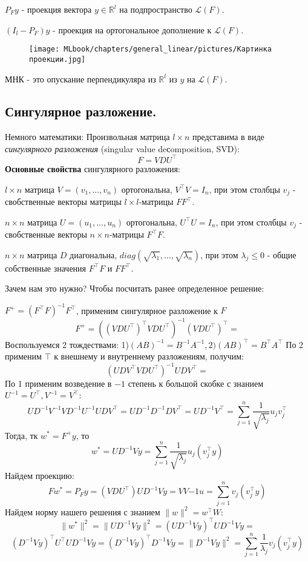 $P_Fy$ - проекция вектора $y \in \mathbb{R}^l$ на подпространство $\mathcal{L}(F)$.

$(I_l - P_F)y$ - проекция на ортогональное дополнение к $\mathcal{L}(F)$.

\begin{figure}[h]
    \centering
    \texttt{[image: MLbook/chapters/general\_linear/pictures/Картинка проекции.jpg]}
\end{figure}

МНК - это опускание перпендикуляра из $\mathbb{R}^l$ из $y$ на $\mathcal{L}(F)$.
 
\subsection*{Сингулярное разложение.} 

Немного математики:
Произвольная матрица $l \times n$ представима в виде \textit{сингулярного разложения}  (singular value deсomposition, SVD):
$$F = VDU^\top$$
\noindent\textbf{Основные свойства} сингулярного разложения:

$l \times n$ матрица $V = (v_1, ..., v_n)$ ортогональна, $V^\top V = I_n$, при этом столбцы $v_j$ - свобственные векторы матрицы $l \times l$-матрицы $FF^\top$.

$n \times n$ матрица $U = (u_1, ..., u_n)$ ортогональна, $U^\top U = I_n$, при этом столбцы $v_j$ - свобственные векторы $n \times n$-матрицы $F^\top F$.

$n \times n$ матрица $D$ диагональна, $diag(\sqrt{\lambda_1}, ..., \sqrt{\lambda_n})$, при этом $\lambda_j \leq 0$ - общие собственные значения $F^\top F$ и $FF^\top$.

Зачем нам это нужно? Чтобы посчитать ранее определенное решение:

$F^+ = (F^\top F)^{-1}F^\top$, применим сингулярное разложение к $F$
$$F^+ = ((VDU^\top)^\top VDU^\top)^{-1} (VDU^\top)^\top =$$ 
Воспользуемся 2 тождествами: 1)$(AB)^{-1} = B^{-1} A^{-1}, 2) (AB)^{\top} = B^{\top} A^{\top}$
По 2 применим $\top$ к внешнему и внутреннему разложениям, получим:
$$(UDV^\top VDU^\top)^{-1} UDV^\top =$$
По 1 применим возведение в $-1$ степень к большой скобке с знанием $U^{-1} = U^\top, V^{-1} = V^\top$:
$$UD^{-1}V^{-1}VD^{-1}U^{-1} UDV^\top = UD^{-1}D^{-1}DV^\top = UD^{-1}V^\top = \sum_{j = 1}^n \frac{1}{\sqrt{\lambda_j}}u_j v_j^\top$$
Тогда, тк $w^* = F^+ y$, то
$$w^* = UD^{-1}Vy = \sum_{j = 1}^n \frac{1}{\sqrt{\lambda_j}}u_j (v_j^\top y)$$
Найдем проекцию:
$$Fw^* = P_Fy = (VDU^\top) UD^{-1}Vy = VV{-1}u = \sum_{j = 1}^n v_j(v_j^\top y)$$
Найдем норму нашего решения с знанием $\|w\|^2 = w^\top W$:
$$\|w^*\|^2 = \|UD^{-1}Vy\|^2 = (UD^{-1}Vy)^\top UD^{-1}Vy =$$
$$(D^{-1}Vy)^{\top} U^\top UD^{-1}Vy = (D^{-1}Vy)^{\top} D^{-1}Vy = \|D^{-1}Vy\|^2 =  \sum_{j = 1}^n \frac{1}{\lambda_j}v_j(v_j^\top y)$$

